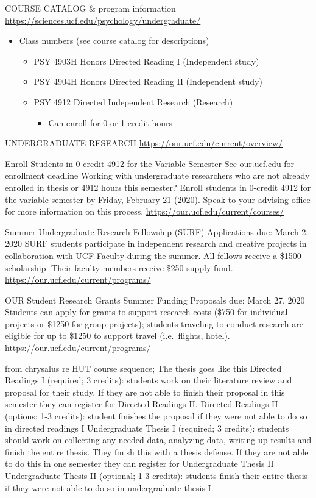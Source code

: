 \documentclass[
]{book}
\providecommand{\tightlist}{%
  \setlength{\itemsep}{0pt}\setlength{\parskip}{0pt}}
\begin{document}
COURSE CATALOG \& program information
\url{https://sciences.ucf.edu/psychology/undergraduate/}

\begin{itemize}
\tightlist
\item
  Class numbers (see course catalog for descriptions)

  \begin{itemize}
  \tightlist
  \item
    PSY 4903H Honors Directed Reading I (Independent study)
  \item
    PSY 4904H Honors Directed Reading II (Independent study)
  \item
    PSY 4912 Directed Independent Research (Research)

    \begin{itemize}
    \tightlist
    \item
      Can enroll for 0 or 1 credit hours
    \end{itemize}
  \end{itemize}
\end{itemize}

UNDERGRADUATE RESEARCH
\url{https://our.ucf.edu/current/overview/}

Enroll Students in 0-credit 4912 for the Variable Semester
See our.ucf.edu for enrollment deadline
Working with undergraduate researchers who are not already enrolled in thesis or 4912 hours this semester? Enroll students in 0-credit 4912 for the variable semester by Friday, February 21 (2020). Speak to your advising office for more information on this process.
\url{https://our.ucf.edu/current/courses/}

Summer Undergraduate Research Fellowship (SURF)
Applications due: March 2, 2020
SURF students participate in independent research and creative projects in collaboration with UCF Faculty during the summer. All fellows receive a \$1500 scholarship. Their faculty members receive \$250 supply fund.
\url{https://our.ucf.edu/current/programs/}

OUR Student Research Grants Summer Funding
Proposals due: March 27, 2020
Students can apply for grants to support research costs (\$750 for individual projects or \$1250 for group projects); students traveling to conduct research are eligible for up to \$1250 to support travel (i.e.~flights, hotel).
\url{https://our.ucf.edu/current/programs/}

from chrysalus re HUT course sequence;
The thesis goes like this
Directed Readings I (required; 3 credits): students work on their literature review and proposal for their study. If they are not able to finish their proposal in this semester they can register for Directed Readings II.
Directed Readings II (options; 1-3 credits): student finishes the proposal if they were not able to do so in directed readings I
Undergraduate Thesis I (required; 3 credits): students should work on collecting any needed data, analyzing data, writing up results and finish the entire thesis. They finish this with a thesis defense. If they are not able to do this in one semester they can register for Undergraduate Thesis II
Undergraduate Thesis II (optional; 1-3 credits): students finish their entire thesis if they were not able to do so in undergraduate thesis I.
\end{document}
